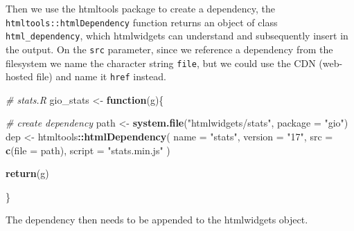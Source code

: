 \documentclass[10pt,]{krantz}
\makeatletter
\newenvironment{Shaded}{\begin{snugshade}}{\end{snugshade}}
\newcommand{\CommentTok}[1]{\textcolor[rgb]{0.37,0.37,0.37}{\textit{#1}}}
\newcommand{\ControlFlowTok}[1]{\textcolor[rgb]{0.27,0.27,0.27}{\textbf{#1}}}
\newcommand{\DataTypeTok}[1]{\textcolor[rgb]{0.27,0.27,0.27}{#1}}
\newcommand{\KeywordTok}[1]{\textcolor[rgb]{0.27,0.27,0.27}{\textbf{#1}}}
\newcommand{\NormalTok}[1]{#1}
\newcommand{\OperatorTok}[1]{\textcolor[rgb]{0.43,0.43,0.43}{\textbf{#1}}}
\newcommand{\StringTok}[1]{\textcolor[rgb]{0.5,0.5,0.5}{#1}}
\newenvironment{kframe}{%
\medskip{}
\setlength{\fboxsep}{.8em}
 \def\at@end@of@kframe{}%
 \ifinner\ifhmode%
  \def\at@end@of@kframe{\end{minipage}}%
  \begin{minipage}{\columnwidth}%
 \fi\fi%
 \def\FrameCommand##1{\hskip\@totalleftmargin \hskip-\fboxsep
 \colorbox{shadecolor}{##1}\hskip-\fboxsep
     \hskip-\linewidth \hskip-\@totalleftmargin \hskip\columnwidth}%
 \MakeFramed {\advance\hsize-\width
   \@totalleftmargin\z@ \linewidth\hsize
   \@setminipage}}%
 {\par\unskip\endMakeFramed%
 \at@end@of@kframe}
\renewenvironment{Shaded}{\begin{kframe}}{\end{kframe}}
\makeatother
\begin{document}
Then we use the htmltools package to create a dependency, the \texttt{htmltools::htmlDependency} function returns an object of class \texttt{html\_dependency}, which htmlwidgets can understand and subsequently insert in the output. On the \texttt{src} parameter, since we reference a dependency from the filesystem we name the character string \texttt{file}, but we could use the CDN (web-hosted file) and name it \texttt{href} instead.

\begin{Shaded}
\begin{Highlighting}[]
\CommentTok{# stats.R}
\NormalTok{gio_stats <-}\StringTok{ }\ControlFlowTok{function}\NormalTok{(g)\{}

  \CommentTok{# create dependency}
\NormalTok{  path <-}\StringTok{ }\KeywordTok{system.file}\NormalTok{(}\StringTok{"htmlwidgets/stats"}\NormalTok{, }\DataTypeTok{package =} \StringTok{"gio"}\NormalTok{)}
\NormalTok{  dep <-}\StringTok{ }\NormalTok{htmltools}\OperatorTok{::}\KeywordTok{htmlDependency}\NormalTok{(}
    \DataTypeTok{name =} \StringTok{"stats"}\NormalTok{,}
    \DataTypeTok{version =} \StringTok{"17"}\NormalTok{,}
    \DataTypeTok{src =} \KeywordTok{c}\NormalTok{(}\DataTypeTok{file =}\NormalTok{ path),}
    \DataTypeTok{script =} \StringTok{"stats.min.js"}
\NormalTok{  )}

  \KeywordTok{return}\NormalTok{(g)}

\NormalTok{\}}
\end{Highlighting}
\end{Shaded}

The dependency then needs to be appended to the htmlwidgets object.

\begin{Shaded}
\end{Shaded}
\end{document}
